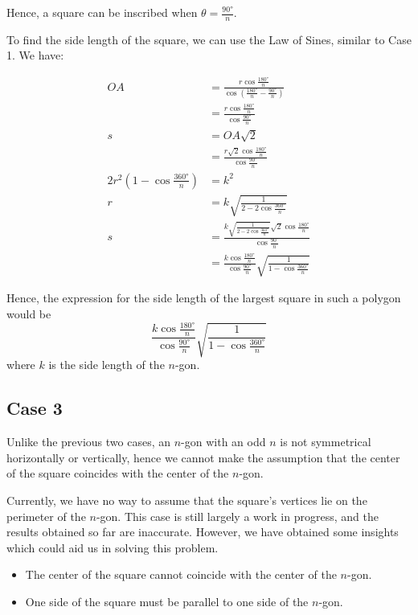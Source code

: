 \documentclass[12pt]{scrartcl}
\begin{document}
Hence, a square can be inscribed when $\theta = \frac{\ang{90}}{n}$.

To find the side length of the square, we can use the Law of Sines, similar to Case 1. We have:

\begin{align*}
	OA & = \frac{r \cos \frac{\ang{180}}{n}}{\cos \left(\frac{\ang{180}}{n} - \frac{\ang{90}}{n}\right)}  \\
	& = \frac{r \cos \frac{\ang{180}}{n}}{\cos \frac{\ang{90}}{n}}  \\
	s & = OA\sqrt{2} \\
	& = \frac{r \sqrt{2} \cos \frac{\ang{180}}{n}}{\cos \frac{\ang{90}}{n}}  \\
	2r^2 \left(1 - \cos \frac{\ang{360}}{n}\right) & = k^2  \\
	r & = k\sqrt{\frac{1}{2 - 2\cos\frac{\ang{360}}{n}}}  \\
	s & =\frac{k\sqrt{\frac{1}{2 - 2\cos\frac{\ang{360}}{n}}} \sqrt{2} \cos \frac{\ang{180}}{n}}{\cos \frac{\ang{90}}{n}}  \\
	& = \frac{k \cos \frac{\ang{180}}{n}}{\cos \frac{\ang{90}}{n}}\sqrt{\frac{1}{1 - \cos\frac{\ang{360}}{n}}}
\end{align*}

Hence, the expression for the side length of the largest square in such a polygon would be
\begin{equation}
\frac{k \cos \frac{\ang{180}}{n}}{\cos \frac{\ang{90}}{n}}\sqrt{\frac{1}{1 - \cos\frac{\ang{360}}{n}}}
\end{equation}
where $k$ is the side length of the $n$-gon.

\pagebreak

\subsection{Case 3}
Unlike the previous two cases, an $n$-gon with an odd $n$ is not symmetrical horizontally or vertically, hence we cannot make the assumption that the center of the square coincides with the center of the $n$-gon.

Currently, we have no way to assume that the square's vertices lie on the perimeter of the $n$-gon.
This case is still largely a work in progress, and the results obtained so far are inaccurate. However, we have obtained some insights which could aid us in solving this problem.

\begin{itemize}
\item The center of the square cannot coincide with the center of the $n$-gon.
\item One side of the square must be parallel to one side of the $n$-gon.
\end{itemize}
\end{document}
